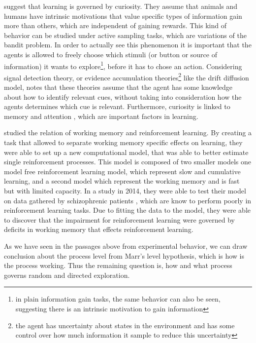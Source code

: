 \cite{gottlieb2018towards} suggest that learning is governed by curiosity. They assume that animals and humans have intrinsic motivations that value specific types of information gain more than others, which are independent of gaining rewards. This kind of behavior can be studied under active sampling tasks, which are variations of the bandit problem. In order to actually see this phenomenon it is important that the agents is allowed to freely choose which stimuli (or button or source of information) it wants to explore\footnote{in plain information gain tasks, the same behavior can also be seen, suggesting there is an intrinsic motivation to gain information}, before it has to chose an action. 
Considering signal detection theory, or evidence accumulation theories\footnote{the agent has uncertainty about states in the environment and has some control over how much information it sample to reduce this uncertainty} like the drift diffusion model, \cite{gottlieb2018towards} notes that these theories assume that the agent has some knowledge about how to identify relevant cues, without taking into consideration how the agents determines which cue is relevant. 
Furthermore, curiosity is linked to memory \citep{gruber2014states, kang2009wick} and attention \citep{jepma2012neural}, which are important factors in learning.


\cite{collins2012much} studied the relation of working memory and reinforcement learning. By creating a task that allowed to separate working memory specific effects on learning, they were able to set up a new computational model, that was able to better estimate single reinforcement processes. This model is composed of two smaller models one model free reinforcement learning model, which represent slow and cumulative learning, and a second model which represent the working memory and is fast but with limited capacity. In a study in 2014, they were able to test their model on data gathered by schizophrenic patients \citep{collins2014working}, which are know to perform poorly in reinforcement learning tasks. Due to fitting the data to the model, they were able to discover that the impairment for reinforcement learning were governed by deficits in working memory that effects reinforcement learning. 


As we have seen in the passages above from experimental behavior, we can draw conclusion about the process level from Marr's level hypothesis, which is how is the process working. Thus the remaining question is, how and what process governs random and directed exploration. 

